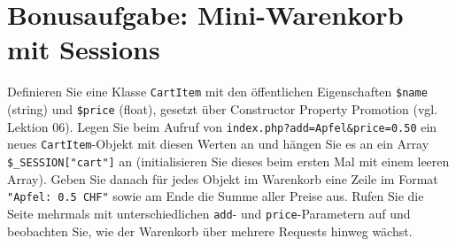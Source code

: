 \documentclass[a4paper,12pt]{article}
\begin{document}
\section{Bonusaufgabe: Mini-Warenkorb mit Sessions}

Definieren Sie eine Klasse \texttt{CartItem} mit den öffentlichen Eigenschaften \texttt{\$name} (string) und \texttt{\$price} (float), gesetzt über Constructor Property Promotion (vgl. Lektion 06). Legen Sie beim Aufruf von \texttt{index.php?add=Apfel\&price=0.50} ein neues \texttt{CartItem}-Objekt mit diesen Werten an und hängen Sie es an ein Array \texttt{\$\_SESSION["{}cart"{}]} an (initialisieren Sie dieses beim ersten Mal mit einem leeren Array). Geben Sie danach für jedes Objekt im Warenkorb eine Zeile im Format \texttt{"{}Apfel: 0.5 CHF"{}} sowie am Ende die Summe aller Preise aus. Rufen Sie die Seite mehrmals mit unterschiedlichen \texttt{add}- und \texttt{price}-Parametern auf und beobachten Sie, wie der Warenkorb über mehrere Requests hinweg wächst.
\end{document}
